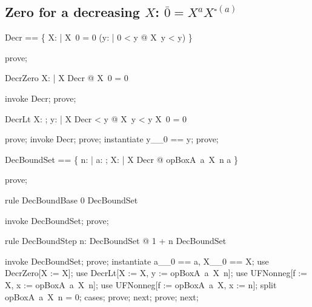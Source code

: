 \documentclass{article}
\begin{document}
\subsection{Zero for a decreasing $X$: $\bar 0 = X^a X^{\square(a)}$}

\begin{zed}
  Decr == \{ X: \nat \fun \nat | X~0 = 0 \land (\forall y: \nat | 0 < y @ X~y < y) \}
\end{zed}

\begin{zproof}
prove;
\end{zproof}

\begin{theorem}{DecrZero}
  \forall X: \nat \fun \nat | X \in Decr @ X~0 = 0
\end{theorem}

\begin{zproof}
invoke Decr;
prove;
\end{zproof}

\begin{theorem}{DecrLt}
  \forall X: \nat \fun \nat; y: \nat | X \in Decr  < y @ X~y < y \land X~0 = 0
\end{theorem}

\begin{zproof}
prove;
invoke Decr;
prove;
instantiate y\_\_0 == y;
prove;
\end{zproof}

\begin{zed}
  DecBoundSet == \{ n: \nat | \forall a: \nat; X: \nat \fun \nat | X \in Decr @ opBoxA~a~X~n \leq a \}
\end{zed}

\begin{zproof}
prove;
\end{zproof}

\begin{theorem}{rule DecBoundBase}
  0 \in DecBoundSet
\end{theorem}

\begin{zproof}
invoke DecBoundSet;
prove;
\end{zproof}

\begin{theorem}{rule DecBoundStep}
  \forall n: DecBoundSet @ 1 + n \in DecBoundSet
\end{theorem}

\begin{zproof}
invoke DecBoundSet;
prove;
instantiate a\_\_0 == a, X\_\_0 == X;
use DecrZero[X := X];
use DecrLt[X := X, y := opBoxA~a~X~n];
use UFNonneg[f := X, x := opBoxA~a~X~n];
use UFNonneg[f := opBoxA~a~X, x := n];
split opBoxA~a~X~n = 0;
cases;
prove;
next;
prove;
next;
\end{zproof}
\end{document}
